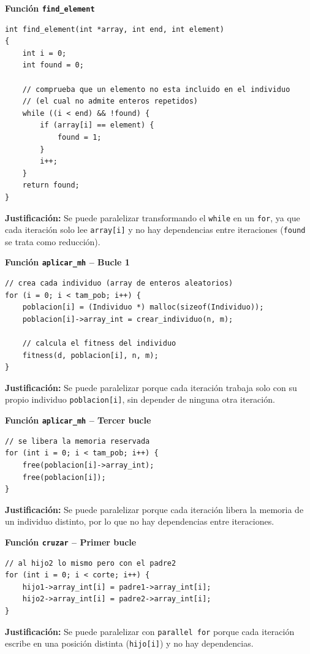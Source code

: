 \documentclass[12pt]{article}
\begin{document}
\begin{enumerate}
	


\vspace{0.3cm}
\textbf{Función \texttt{find\_element}}
\begin{lstlisting}[style=EstiloC]
int find_element(int *array, int end, int element)
{
    int i = 0;
    int found = 0;

    // comprueba que un elemento no esta incluido en el individuo
    // (el cual no admite enteros repetidos)
    while ((i < end) && !found) {
        if (array[i] == element) {
            found = 1;
        }
        i++;
    }
    return found;
}
\end{lstlisting}
\textbf{Justificación:} Se puede paralelizar transformando el \texttt{while} en un \texttt{for}, ya que cada iteración solo lee \texttt{array[i]} y no hay dependencias entre iteraciones (\texttt{found} se trata como reducción).

\vspace{0.3cm}
\textbf{Función \texttt{aplicar\_mh} -- Bucle 1}
\begin{lstlisting}[style=EstiloC]
// crea cada individuo (array de enteros aleatorios)
for (i = 0; i < tam_pob; i++) {
    poblacion[i] = (Individuo *) malloc(sizeof(Individuo));
    poblacion[i]->array_int = crear_individuo(n, m);

    // calcula el fitness del individuo
    fitness(d, poblacion[i], n, m);
}
\end{lstlisting}
\textbf{Justificación:} Se puede paralelizar porque cada iteración trabaja solo con su propio individuo \texttt{poblacion[i]}, sin depender de ninguna otra iteración.

\vspace{0.3cm}
\textbf{Función \texttt{aplicar\_mh} -- Tercer bucle}
\begin{lstlisting}[style=EstiloC]
// se libera la memoria reservada
for (int i = 0; i < tam_pob; i++) {
    free(poblacion[i]->array_int);
    free(poblacion[i]);
}
\end{lstlisting}
\textbf{Justificación:} Se puede paralelizar porque cada iteración libera la memoria de un individuo distinto, por lo que no hay dependencias entre iteraciones.

\vspace{0.3cm}
\textbf{Función \texttt{cruzar} -- Primer bucle}
\begin{lstlisting}[style=EstiloC]
// al hijo2 lo mismo pero con el padre2
for (int i = 0; i < corte; i++) {
    hijo1->array_int[i] = padre1->array_int[i];
    hijo2->array_int[i] = padre2->array_int[i];
}
\end{lstlisting}
\textbf{Justificación:} Se puede paralelizar con \texttt{parallel for} porque cada iteración escribe en una posición distinta (\texttt{hijo[i]}) y no hay dependencias.


\end{enumerate}
\end{document}
